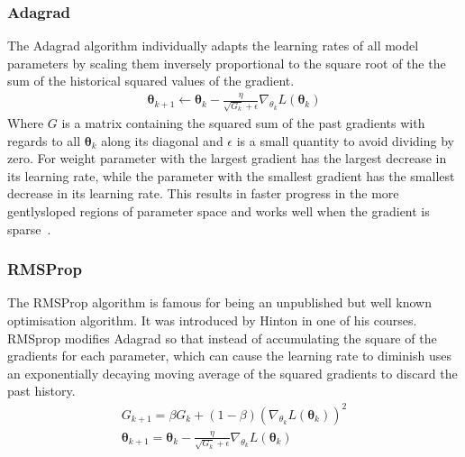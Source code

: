 \documentclass[11pt]{report}
\begin{document}
    \subsubsection{Adagrad}
    The Adagrad algorithm individually adapts the learning rates of all model parameters by scaling them inversely
    proportional to the square root of the the sum of the historical squared values of the gradient.
    \begin{align*}
        \pmb\theta_{k+1} \gets \pmb\theta_{k} - \frac{\eta}{  \sqrt{G_{k}} + \epsilon } \nabla_{\theta_k} L( \pmb\theta_k)
    \end{align*}
    Where $G$ is a matrix containing the squared sum of the past gradients with regards to all $\pmb\theta_k$ along its
    diagonal and $\epsilon$ is a small quantity to avoid dividing by zero.
    For weight parameter with the largest gradient has the largest decrease in its learning rate, while the parameter
    with the smallest gradient has the smallest decrease in its learning rate.
    This results in faster progress in the more gentlysloped regions of parameter space and works well when the
    gradient is sparse~\cite{duchi2011adaptive}.

    \subsubsection{RMSProp}
    The RMSProp algorithm is famous for being an unpublished but well known optimisation algorithm.
    It was introduced by Hinton in one of his courses.
    RMSprop modifies Adagrad so that instead of accumulating the square of the gradients for each parameter, which can
    cause the learning rate to diminish uses an exponentially decaying moving average of the squared gradients to
    discard the past history.
    \begin{align*}
        G_{k+1} = \beta G_{k} + (1 - \beta) ( \nabla_{\theta_k} L (\pmb\theta_k) )^2\\
        \pmb\theta_{k+1} = \pmb\theta_{k} - \frac{\eta}{  \sqrt{G_{k}} + \epsilon } \nabla_{\theta_k} L( \pmb\theta_k)
    \end{align*}
\end{document}
